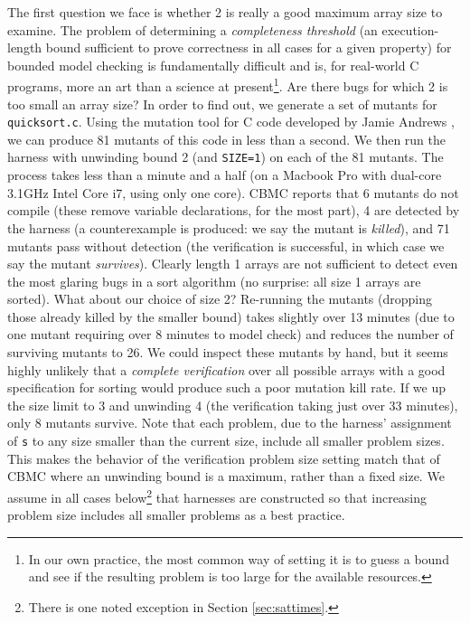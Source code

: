 \documentclass[conference]{IEEEtran}
\begin{document}
The first question we face is whether 2 is really a good maximum array
size to examine.  The problem of determining a \emph{completeness
  threshold} (an execution-length bound sufficient to prove correctness
in all cases for a given property) for bounded model checking is
fundamentally difficult \cite{CTDaniel} and is, for real-world C
programs, more an art than a science at present\footnote{In our own
  practice, the most common way of setting it is to guess a bound and
  see if the resulting problem is too large for the available
  resources.}.  Are there bugs for which 2 is too small
an array size?  In order to find out, we generate a set of mutants for
{\tt quicksort.c}.  Using the mutation tool for C code developed by
Jamie Andrews \cite{mutant}, we can produce 81 mutants of this code in
less than a second.  We then run the harness with unwinding bound 2
(and {\tt SIZE=1}) on each of the 81 mutants.  The process takes less
than a minute and a half (on a Macbook Pro with dual-core 3.1GHz Intel
Core i7, using only one core).  CBMC reports that 6 mutants do not
compile (these remove variable declarations, for the most part), 4 are
detected by the harness (a counterexample is produced: we say the
mutant is \emph{killed}), and 71 mutants pass without detection (the
verification is successful, in which case we say the mutant \emph{survives}).
Clearly length 1 arrays are not sufficient to detect even the most
glaring bugs in a sort algorithm (no surprise: all size 1 arrays are
sorted).  What about our choice of size 2?  Re-running the mutants
(dropping those already killed by the smaller bound) takes slightly
over 13 minutes (due to one mutant requiring over 8 minutes
to model check) and reduces the number of surviving mutants to 26.  We
could inspect these mutants by hand, but it seems highly unlikely that
a \emph{complete verification} over all possible arrays with a good
specification for sorting would produce such a poor mutation kill rate.
If we up the size limit to 3 and unwinding 4 (the verification taking just over 33
minutes), only 8 mutants survive.  Note that each problem, due to the
harness' assignment of {\tt s} to any size smaller than the current
size, include all smaller problem sizes. This makes the behavior of
the verification problem size setting match that of CBMC where an unwinding bound is a maximum, rather than
a fixed size.  We assume in all cases below\footnote{There is
  one noted exception in Section \ref{sec:sattimes}.} that harnesses are
constructed so that increasing problem size includes all smaller
problems as a best practice.
\end{document}
